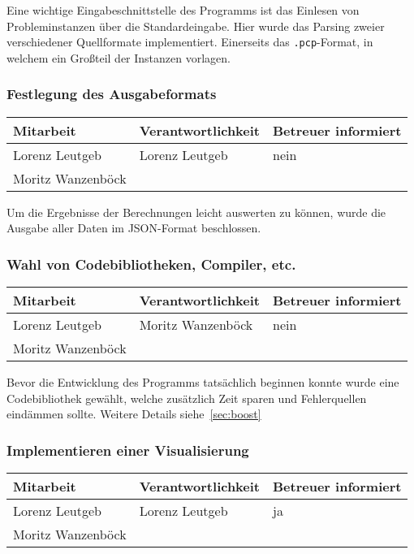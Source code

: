Eine wichtige Eingabeschnittstelle des Programms ist das Einlesen von Probleminstanzen über die Standardeingabe. Hier wurde das Parsing zweier verschiedener Quellformate implementiert. Einerseits das \texttt{.pcp}-Format, in welchem ein Großteil der Instanzen vorlagen.%

\subsubsection{ Festlegung des Ausgabeformats}

\begin{center}
\begin{tabular}{lll}
	Mitarbeit & Verantwortlichkeit & Betreuer informiert \\
	\hline
	Lorenz Leutgeb & Lorenz Leutgeb & nein \\
	Moritz Wanzenböck & & \\
\end{tabular}
\end{center}

Um die Ergebnisse der Berechnungen leicht auswerten zu können, wurde die Ausgabe aller Daten im JSON-Format beschlossen.

\subsubsection{ Wahl von Codebibliotheken, Compiler, etc.}

\begin{center}
\begin{tabular}{lll}
	Mitarbeit & Verantwortlichkeit & Betreuer informiert \\
	\hline
	Lorenz Leutgeb & Moritz Wanzenböck & nein \\
	Moritz Wanzenböck & & \\
\end{tabular}
\end{center}

Bevor die Entwicklung des Programms tatsächlich beginnen konnte wurde eine Code\-bi\-bli\-othek gewählt, welche zusätzlich Zeit sparen und Fehlerquellen eindämmen sollte. Weitere Details siehe~\ref{sec:boost}

\subsubsection{ Implementieren einer Visualisierung}

\begin{center}
\begin{tabular}{lll}
	Mitarbeit & Verantwortlichkeit & Betreuer informiert \\
	\hline
	Lorenz Leutgeb & Lorenz Leutgeb & ja \\
	Moritz Wanzenböck & & \\
\end{tabular}
\end{center}

